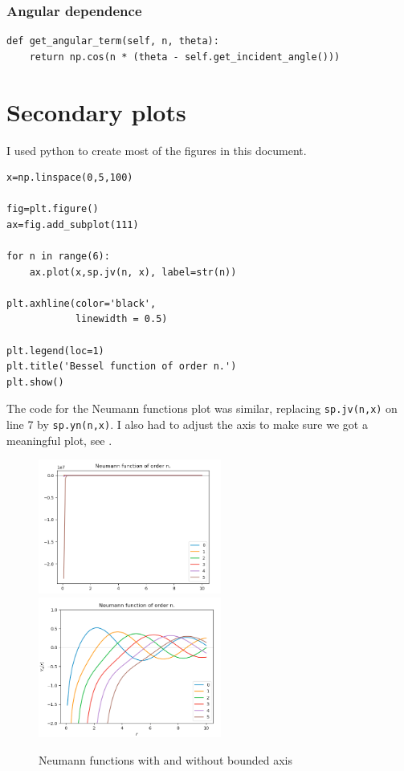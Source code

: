 \subsubsection{Angular dependence}
%
  \begin{lstlisting}
def get_angular_term(self, n, theta):
    return np.cos(n * (theta - self.get_incident_angle()))\end{lstlisting}
%
\section{Secondary plots}\label{ss:secondary_plots}
I used python to create most of the figures in this document.
%
  \begin{lstlisting}[caption={Plot of bessel functions of integer order},label={lst:bessel_int_no}]
x=np.linspace(0,5,100)

fig=plt.figure()
ax=fig.add_subplot(111)

for n in range(6):
    ax.plot(x,sp.jv(n, x), label=str(n))

plt.axhline(color='black',
            linewidth = 0.5)

plt.legend(loc=1)
plt.title('Bessel function of order n.')
plt.show()\end{lstlisting}\par
%
The code for the Neumann functions plot was similar, replacing \verb!sp.jv(n,x)! on line 7 by \verb!sp.yn(n,x)!. I also had to adjust the axis to make sure we got a meaningful plot, see .\par
%
\begin{figure} \centering
  \includegraphics[width=6cm]{../figures/plot_neumann_unbounded_y}
  \includegraphics[width=6cm]{../figures/plot_neumann_int_order}
  \caption{Neumann functions with and without bounded axis}\label{fig:neumann_bounding_axis}
\end{figure}
